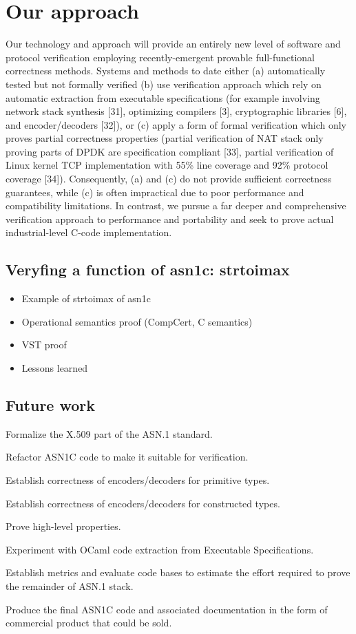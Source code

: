 \documentclass[12pt,usenames,dvipsnames]{paper}
\begin{document}
\section{Our approach}
  Our technology and approach will provide an entirely new level of software and protocol verification employing recently-emergent provable full-functional correctness methods.
Systems and methods to date either (a) automatically tested but not formally verified (b) use verification approach which rely on automatic extraction from executable specifications (for example involving network stack synthesis [31], optimizing compilers [3], cryptographic libraries [6], and encoder/decoders [32]), or (c) apply a form of formal verification which only proves partial correctness properties (partial verification of NAT stack only proving parts of DPDK are specification compliant [33], partial verification of Linux kernel TCP implementation with 55\% line coverage and 92\% protocol coverage [34]). Consequently, (a) and (c) do not provide sufficient correctness guarantees, while (c) is often impractical due to poor performance and compatibility limitations. In contrast, we pursue a far deeper and comprehensive verification approach to performance and portability and seek to prove actual industrial-level C-code implementation.
  \subsection{Veryfing a function of asn1c: strtoimax}
\begin{itemize}
    \item Example of strtoimax of asn1c
  \item Operational semantics proof (CompCert, C semantics)
  \item VST proof 
  \item Lessons learned
  \end{itemize}
\subsection{Future work}
  Formalize the X.509 part of the ASN.1 standard.  
   
  Refactor ASN1C code to make it suitable for verification.

  Establish correctness of encoders/decoders for primitive types.

  Establish correctness of encoders/decoders for constructed types.

  Prove high-level properties.

  Experiment with OCaml code extraction from Executable Specifications.

  Establish metrics and evaluate code bases to estimate the effort required to prove the remainder of ASN.1 stack.

  Produce the final ASN1C code and associated documentation in the form of commercial product that could be sold.
\end{document}
